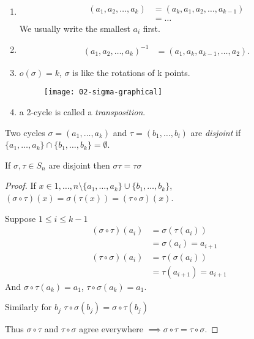 \begin{remark} ~
\begin{enumerate}
\def\labelenumi{\roman{enumi}.}
\item
  \begin{align*}
   (a_1, a_2, \dots, a_k) &= (a_k, a_1, a_2, \dots, a_{k-1}) \\
   &= \dots
  \end{align*} We usually write the smallest $a_i$ first.
\item
  \begin{align*}
  (a_1, a_2, \dots, a_k)^{-1} &= (a_1, a_k, a_{k-1}, \dots, a_2).
  \end{align*}
\item
  $o(\sigma) = k$, $\sigma$ is like the rotations of k points.
  \begin{figure}
    \centering \texttt{[image: 02-sigma-graphical]}
  \end{figure} 
\item
  a 2-cycle is called a \emph{transposition}.
\end{enumerate}

\end{remark}

\begin{definition}
Two cycles $\sigma = (a_1, \dots, a_k)$ and $\tau = (b_1, \dots, b_l)$ are \emph{disjoint} if $\{ a_1, \dots, a_k \} \cap \{ b_1, \dots, b_k \} = \emptyset$.
\end{definition}

\begin{lemma}
\protect\hypertarget{lem:six}{}\label{lem:six}
If $\sigma, \tau \in S_n$ are disjoint then $\sigma \tau = \tau \sigma$
\end{lemma}

\begin{proof}
If $x \in {1, \dots, n} \setminus \{ a_1, \dots, a_k \} \cup \{ b_1, \dots, b_k \}$, $(\sigma \circ \tau) (x) = \sigma \left( \tau(x) \right) = (\tau \circ \sigma)(x)$.

Suppose $1 \leq i \leq k - 1$
\begin{align*}
    (\sigma \circ \tau)(a_i) &= \sigma\left(\tau(a_i) \right) \\
    &= \sigma(a_i) = a_{i + 1} \\
    (\tau \circ \sigma)(a_i) &= \tau\left(\sigma(a_i) \right) \\
    &= \tau(a_{i + 1}) = a_{i + 1}
\end{align*}
And $\sigma \circ \tau (a_k) = a_1$, $\tau \circ \sigma (a_k) = a_1$.

Similarly for $b_j$
$\tau \circ \sigma (b_j) = \sigma \circ \tau (b_j)$

Thus $\sigma \circ \tau$ and $\tau \circ \sigma$ agree everywhere $\implies \sigma \circ \tau = \tau \circ \sigma$.
\end{proof}

